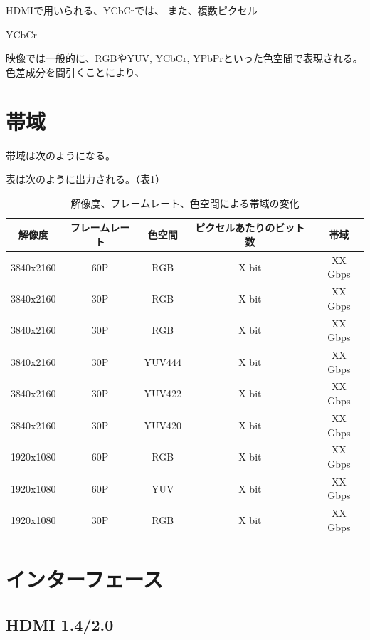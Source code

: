 HDMIで用いられる、YCbCrでは、
また、複数ピクセル

YCbCr

映像では一般的に、RGBやYUV, YCbCr, YPbPrといった色空間で表現される。
色差成分を間引くことにより、

\section{帯域}

帯域は次のようになる。

表は次のように出力される。（表\ref{tb:video-bandwidth}）

\begin{table}[htbp]
  \caption{解像度、フレームレート、色空間による帯域の変化}
  \label{tb:video-bandwidth}
  \begin{center}
  \begin{tabular}{c|c|c|c|c}
    \hline
    解像度     & フレームレート & 色空間 & ピクセルあたりのビット数 & 帯域\\\hline\hline
    3840x2160 & 60P          & RGB    & X bit               & XX Gbps\\\hline
    3840x2160 & 30P          & RGB    & X bit               & XX Gbps\\\hline
    3840x2160 & 30P          & RGB    & X bit               & XX Gbps\\\hline
    3840x2160 & 30P          & YUV444 & X bit               & XX Gbps\\\hline
    3840x2160 & 30P          & YUV422 & X bit               & XX Gbps\\\hline
    3840x2160 & 30P          & YUV420 & X bit               & XX Gbps\\\hline
    1920x1080 & 60P          & RGB    & X bit               & XX Gbps\\\hline
    1920x1080 & 60P          & YUV    & X bit               & XX Gbps\\\hline
    1920x1080 & 30P          & RGB    & X bit               & XX Gbps\\\hline
  \end{tabular}\end{center}
\end{table}

\section{インターフェース}
\subsection{HDMI 1.4/2.0}

